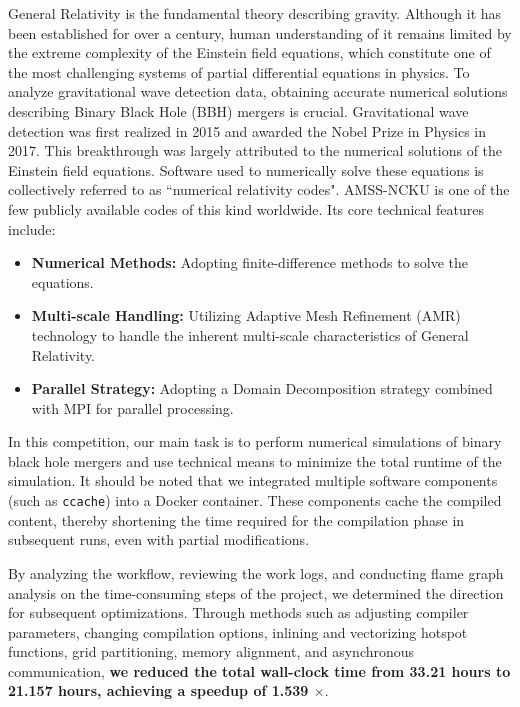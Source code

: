 General Relativity is the fundamental theory describing gravity. 
Although it has been established for over a century, human understanding of it remains limited by the extreme complexity of the Einstein field equations, which constitute one of the most challenging systems of partial differential equations in physics. 
To analyze gravitational wave detection data, obtaining accurate numerical solutions describing Binary Black Hole (BBH) mergers is crucial. 
Gravitational wave detection was first realized in 2015 and awarded the Nobel Prize in Physics in 2017. 
This breakthrough was largely attributed to the numerical solutions of the Einstein field equations.
Software used to numerically solve these equations is collectively referred to as ``numerical relativity codes". 
AMSS-NCKU is one of the few publicly available codes of this kind worldwide\cite{cao2015binary}. 
Its core technical features include:
\begin{itemize}
    \item \textbf{Numerical Methods:} Adopting finite-difference methods to solve the equations.
    \item \textbf{Multi-scale Handling:} Utilizing Adaptive Mesh Refinement (AMR) technology to handle the inherent multi-scale characteristics of General Relativity.
    \item \textbf{Parallel Strategy:} Adopting a Domain Decomposition strategy combined with MPI for parallel processing.
\end{itemize}

In this competition, our main task is to perform numerical simulations of binary black hole mergers and use technical means to minimize the total runtime of the simulation. 
It should be noted that we integrated multiple software components (such as \texttt{ccache}) into a Docker container. 
These components cache the compiled content, thereby shortening the time required for the compilation phase in subsequent runs, even with partial modifications.

By analyzing the workflow, reviewing the work logs, and conducting flame graph analysis on the time-consuming steps of the project, we determined the direction for subsequent optimizations. 
Through methods such as adjusting compiler parameters, changing compilation options, inlining and vectorizing hotspot functions, grid partitioning, memory alignment, and asynchronous communication, \textbf{we reduced the total wall-clock time from 33.21 hours to 21.157 hours, achieving a speedup of 1.539 $\times$}.

